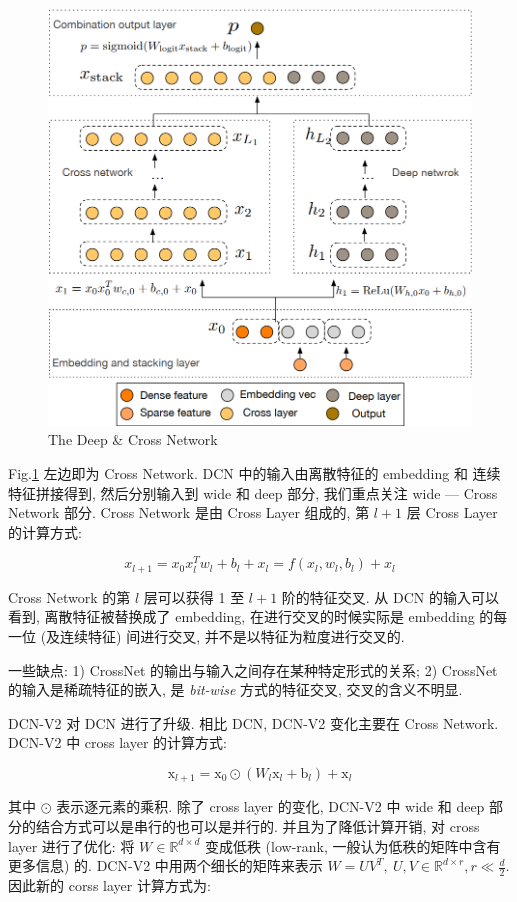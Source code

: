\begin{figure}[h]
	\centering
	\includegraphics[width=.85\textwidth]{pics/dcn.png}
	\caption{The Deep \& Cross Network}
	\label{fig:dcn}
\end{figure} 

Fig.\ref{fig:dcn} 左边即为 Cross Network. DCN 中的输入由离散特征的 embedding 和 连续特征拼接得到, 然后分别输入到 wide 和 deep 部分, 我们重点关注 wide --- Cross Network 部分. Cross Network 是由 Cross Layer 组成的, 第 $l+1$ 层 Cross Layer 的计算方式:

$$
x_{l+1} = x_0 x_l^T w_l + b_l + x_l = f(x_l, w_l, b_l) + x_l
$$

Cross Network 的第 $l$ 层可以获得 1 至 $l+1$ 阶的特征交叉. 从 DCN 的输入可以看到, 离散特征被替换成了 embedding, 在进行交叉的时候实际是 embedding 的每一位 (及连续特征) 间进行交叉, 并不是以特征为粒度进行交叉的. 

一些缺点: 1) CrossNet 的输出与输入之间存在某种特定形式的关系; 2) CrossNet 的输入是稀疏特征的嵌入, 是 \textit{bit-wise} 方式的特征交叉, 交叉的含义不明显.

DCN-V2 对 DCN 进行了升级. 相比 DCN, DCN-V2 变化主要在 Cross Network. DCN-V2 中 cross layer 的计算方式:

$$
\mathrm{x}_{l+1}=\mathrm{x}_0 \odot\left(W_l \mathrm{x}_l+\mathrm{b}_l\right)+\mathrm{x}_l
$$

其中 $\odot$ 表示逐元素的乘积. 除了 cross layer 的变化, DCN-V2 中 wide 和 deep 部分的结合方式可以是串行的也可以是并行的. 并且为了降低计算开销, 对 cross layer 进行了优化: 将 $W \in \mathbb{R}^{d \times d}$ 变成低秩 (low-rank, 一般认为低秩的矩阵中含有更多信息) 的. DCN-V2 中用两个细长的矩阵来表示 $W = U V^T,\ U, V \in \mathbb{R}^{d \times r}, r \ll \frac{d}{2}$. 因此新的 corss layer 计算方式为:

